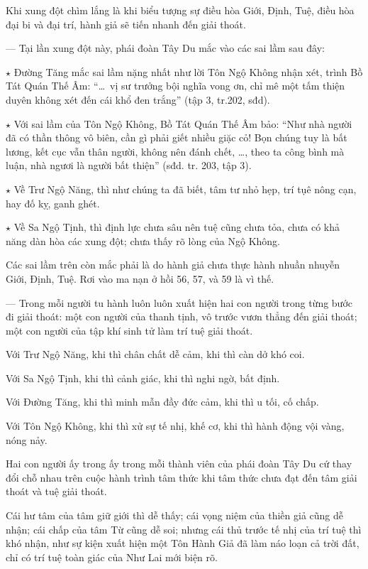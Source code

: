 Khi xung đột chìm lắng là khi biểu tượng sự điều hòa Giới, Định, Tuệ, điều hòa đại bi và đại trí, hành giả sẽ tiến nhanh đến giải thoát.

— Tại lần xung đột này, phái đoàn Tây Du mắc vào các sai lầm sau đây:

$\star$ Đường Tăng mắc sai lầm nặng nhất như lời Tôn Ngộ Không nhận xét, trình Bồ Tát Quán Thế Âm: ``\ldots ~vị sư trưởng bội nghĩa vong ơn, chỉ mê một tấm thiện duyên không xét đến cái khổ đen trắng'' (tập 3, tr.202, sđd).

$\star$ Với sai lầm của Tôn Ngộ Không, Bồ Tát Quán Thế Âm bảo: ``Như nhà người đã có thần thông vô biên, cần gì phải giết nhiều giặc cỏ! Bọn chúng tuy là bất lương, kết cục vẫn thân người, không nên đánh chết, \ldots, theo ta công bình mà luận, nhà ngươi là người bất thiện'' (sđd. tr. 203, tập 3).

$\star$ Về Trư Ngộ Năng, thì như chúng ta đã biết, tâm tư nhỏ hẹp, trí tụê nông cạn, hay đố kỵ, ganh ghét.

$\star$ Về Sa Ngộ Tịnh, thì định lực chưa sâu nên tuệ cũng chưa tỏa, chưa có khả năng dàn hòa các xung đột; chưa thấy rõ lòng của Ngộ Không.

Các sai lầm trên còn mắc phải là do hành giả chưa thực hành nhuần nhuyễn Giới, Định, Tuệ. Rơi vào ma nạn ở hồi 56, 57, và 59 là vì thế.

— Trong mỗi người tu hành luôn luôn xuất hiện hai con người trong từng bước đi giải thoát: một con người của thanh tịnh, vô trước vươn thẳng đến giải thoát; một con người của tập khí sinh tử làm trí tuệ giải thoát.

Với Trư Ngộ Năng, khi thì chân chất dễ cảm, khi thì càn dở khó coi.

Với Sa Ngộ Tịnh, khi thì cảnh giác, khi thì nghi ngờ, bất định.

Với Đường Tăng, khi thì minh mẫn đầy đức cảm, khi thì u tối, cố chấp.

Với Tôn Ngộ Không, khi thì xử sự tế nhị, khế cơ, khi thì hành động vội vàng, nóng nảy.

Hai con người ấy trong ấy trong mỗi thành viên của phái đoàn Tây Du cứ thay đổi chỗ nhau trên cuộc hành trình tâm thức khi tâm thức chưa đạt đến tâm giải thoát và tuệ giải thoát.

Cái hư tâm của tâm giữ giới thì dễ thấy; cái vọng niệm của thiền giả cũng dễ nhận; cái chấp của tâm Từ cũng dễ soi; nhưng cái thủ trước tế nhị của trí tuệ thì khó nhận, như sự kiện xuất hiện một Tôn Hành Giả đã làm náo loạn cả trời đất, chỉ có trí tuệ toàn giác của Như Lai mới biện rõ.

